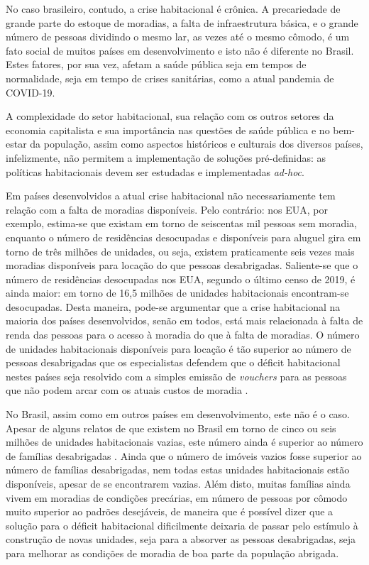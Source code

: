 \documentclass[
	12pt,				%
	oneside,			%
	a4paper,			%
	chapter=TITLE,		%
	section=TITLE,		%
	english,			%
	brazil				%
	]{abntex2}
\begin{document}
\begin{refsection}
No caso brasileiro, contudo, a crise habitacional é crônica. A precariedade de
grande parte do estoque de moradias, a falta de infraestrutura básica, e o
grande número de pessoas dividindo o mesmo lar, as vezes até o mesmo cômodo, é
um fato social de muitos países em desenvolvimento e isto não é diferente no
Brasil. Estes fatores, por sua vez, afetam a saúde pública seja em tempos de
normalidade, seja em tempo de crises sanitárias, como a atual pandemia de
COVID-19.

A complexidade do setor habitacional, sua relação com os outros setores da
economia capitalista e sua importância nas questões de saúde pública e no
bem-estar da população, assim como aspectos históricos e culturais dos diversos
países, infelizmente, não permitem a implementação de soluções pré-definidas: as
políticas habitacionais devem ser estudadas e implementadas \emph{ad-hoc}.

Em países desenvolvidos a atual crise habitacional não necessariamente tem
relação com a falta de moradias disponíveis. Pelo contrário: nos EUA, por
exemplo, estima-se que existam em torno de seiscentas mil pessoas sem moradia,
enquanto o número de residências desocupadas e disponíveis para aluguel gira em
torno de três milhões de unidades, ou seja, existem praticamente seis vezes mais
moradias disponíveis para locação do que pessoas desabrigadas. Saliente-se que o
número de residências desocupadas nos EUA, segundo o último censo de 2019, é
ainda maior: em torno de 16,5 milhões de unidades habitacionais encontram-se
desocupadas. Desta maneira, pode-se argumentar que a crise habitacional na
maioria dos países desenvolvidos, senão em todos, está mais relacionada à falta
de renda das pessoas para o acesso à moradia do que à falta de moradias. O
número de unidades habitacionais disponíveis para locação é tão superior ao
número de pessoas desabrigadas que os especialistas defendem que o
déficit habitacional nestes países seja resolvido
com a simples emissão de \emph{vouchers} para as pessoas que não podem arcar com os
atuais custos de moradia \autocite{olsen_opinion_2016} .

No Brasil, assim como em outros países em desenvolvimento, este não é o caso.
Apesar de alguns relatos de que existem no Brasil em torno de cinco ou seis
milhões de unidades habitacionais vazias, este número ainda é superior ao
número de famílias desabrigadas \autocite{uol}. Ainda que o número de imóveis vazios
fosse superior ao número de famílias desabrigadas, nem todas estas unidades
habitacionais estão disponíveis, apesar de se encontrarem vazias. Além disto,
muitas famílias ainda vivem em moradias de condições precárias, em número de
pessoas por cômodo muito superior ao padrões desejáveis, de maneira que é
possível dizer que a solução para o déficit habitacional dificilmente deixaria
de passar pelo estímulo à construção de novas unidades, seja para a absorver as
pessoas desabrigadas, seja para melhorar as condições de moradia de boa parte da
população abrigada.


\end{refsection}
\end{document}
